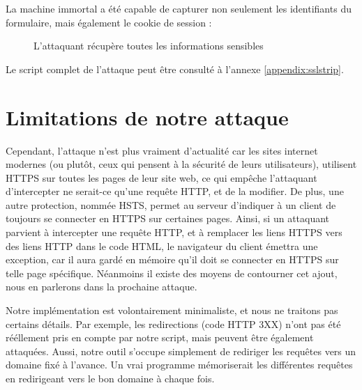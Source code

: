 La machine immortal a été capable de capturer non seulement les identifiants du formulaire, mais également le cookie de session :

\begin{figure}[H]
  \caption{L'attaquant récupère toutes les informations sensibles}
\end{figure}

Le script complet de l'attaque peut être consulté à l'annexe \ref{appendix:sslstrip}.

\section{Limitations de notre attaque}

Cependant, l'attaque n'est plus vraiment d'actualité car les sites internet modernes (ou plutôt, ceux qui pensent à la sécurité de leurs utilisateurs), utilisent HTTPS sur toutes les pages de leur site web, ce qui empêche l'attaquant d'intercepter ne serait-ce qu'une requête HTTP, et de la modifier. De plus, une autre protection, nommée HSTS, permet au serveur d'indiquer à un client de toujours se connecter en HTTPS sur certaines pages. Ainsi, si un attaquant parvient à intercepter une requête HTTP, et à remplacer les liens HTTPS vers des liens HTTP dans le code HTML, le navigateur du client émettra une exception, car il aura gardé en mémoire qu'il doit se connecter en HTTPS sur telle page spécifique. Néanmoins il existe des moyens de contourner cet ajout, nous en parlerons dans la prochaine attaque.

Notre implémentation est volontairement minimaliste, et nous ne traitons pas certains détails. Par exemple, les redirections (code HTTP 3XX) n'ont pas été rééllement pris en compte par notre script, mais peuvent être également attaquées. Aussi, notre outil s'occupe simplement de rediriger les requêtes vers un domaine fixé à l'avance. Un vrai programme mémoriserait les différentes requêtes en redirigeant vers le bon domaine à chaque fois.
